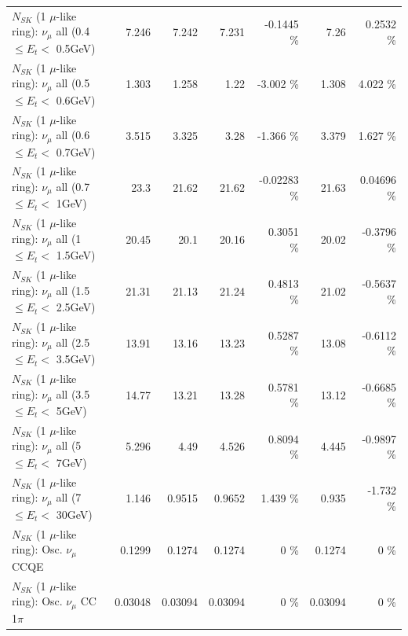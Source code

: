 \begin{table}
\begin{tabular}{| l | r | r | r  r | r  r |}
       $N_{SK}$ (1 $\mu$-like ring): $\nu_{\mu}$ all (0.4 $\leq E_{t} <$ 0.5GeV) &           7.246 &           7.242 &           7.231 &  -0.1445 \%  &            7.26 &   0.2532 \%  \\ 
       $N_{SK}$ (1 $\mu$-like ring): $\nu_{\mu}$ all (0.5 $\leq E_{t} <$ 0.6GeV) &           1.303 &           1.258 &            1.22 &   -3.002 \%  &           1.308 &    4.022 \%  \\ 
       $N_{SK}$ (1 $\mu$-like ring): $\nu_{\mu}$ all (0.6 $\leq E_{t} <$ 0.7GeV) &           3.515 &           3.325 &            3.28 &   -1.366 \%  &           3.379 &    1.627 \%  \\ 
         $N_{SK}$ (1 $\mu$-like ring): $\nu_{\mu}$ all (0.7 $\leq E_{t} <$ 1GeV) &            23.3 &           21.62 &           21.62 & -0.02283 \%  &           21.63 &  0.04696 \%  \\ 
         $N_{SK}$ (1 $\mu$-like ring): $\nu_{\mu}$ all (1 $\leq E_{t} <$ 1.5GeV) &           20.45 &            20.1 &           20.16 &   0.3051 \%  &           20.02 &  -0.3796 \%  \\ 
       $N_{SK}$ (1 $\mu$-like ring): $\nu_{\mu}$ all (1.5 $\leq E_{t} <$ 2.5GeV) &           21.31 &           21.13 &           21.24 &   0.4813 \%  &           21.02 &  -0.5637 \%  \\ 
       $N_{SK}$ (1 $\mu$-like ring): $\nu_{\mu}$ all (2.5 $\leq E_{t} <$ 3.5GeV) &           13.91 &           13.16 &           13.23 &   0.5287 \%  &           13.08 &  -0.6112 \%  \\ 
         $N_{SK}$ (1 $\mu$-like ring): $\nu_{\mu}$ all (3.5 $\leq E_{t} <$ 5GeV) &           14.77 &           13.21 &           13.28 &   0.5781 \%  &           13.12 &  -0.6685 \%  \\ 
           $N_{SK}$ (1 $\mu$-like ring): $\nu_{\mu}$ all (5 $\leq E_{t} <$ 7GeV) &           5.296 &            4.49 &           4.526 &   0.8094 \%  &           4.445 &  -0.9897 \%  \\ 
          $N_{SK}$ (1 $\mu$-like ring): $\nu_{\mu}$ all (7 $\leq E_{t} <$ 30GeV) &           1.146 &          0.9515 &          0.9652 &    1.439 \%  &           0.935 &   -1.732 \%  \\ 
\hline
\hline
                               $N_{SK}$ (1 $\mu$-like ring): Osc. $\nu_\mu$ CCQE &          0.1299 &          0.1274 &          0.1274 &        0 \%  &          0.1274 &        0 \%  \\ 
                          $N_{SK}$ (1 $\mu$-like ring): Osc. $\nu_\mu$ CC 1$\pi$ &         0.03048 &         0.03094 &         0.03094 &        0 \%  &         0.03094 &        0 \%  \\ 

\end{tabular}
\end{table}
